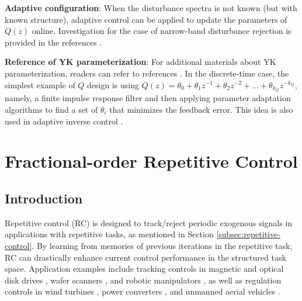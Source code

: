 \documentclass [11pt, proquest] {uwthesis}[2020/02/24]
\begin{document}
\textbf{Adaptive configuration}: When the disturbance spectra is not
known (but with known structure), adaptive control can be applied
to update the parameters of $Q(z)$ online. Investigation for the
case of narrow-band disturbance rejection is provided in the references
\cite{XuChen_TCST2012,chen2010unknown}.

\textbf{Reference of YK parameterization}: For additional materials
about YK parameterization, readers can refer to references \cite{landau2005adaptive,doyle2013feedback,ANDERSON19981485}.
In the discrete-time case, the simplest example of $Q$ design is
using $Q(z)=\theta_{0}+\theta_{1}z^{-1}+\theta_{2}z^{-2}+...+\theta_{k_{Q}}z^{-k_{Q}}$,
namely, a finite impulse response filter and then applying parameter
adaptation algorithms to find a set of $\theta_{i}$ that minimizes
the feedback error. This idea is also used in adaptive inverse control
\cite{Widrow2007}.


\chapter{Fractional-order Repetitive Control} \label{chap:Fractional-RC}

\section{Introduction} \label{sec:Fractional-RC-Introduction}

Repetitive control (RC) \cite{inoue1981highpower} is designed to
track/reject periodic exogenous signals in applications with repetitive
tasks, as mentioned in Section \ref{subsec:repetitive-control}. By learning from memories of previous iterations in the repetitive
task, RC can drastically enhance current control performance in the
structured task space. Application examples include tracking controls
in magnetic and optical disk drives \cite{chew1989digital,doh2006design},
wafer scanners \cite{XuChen_TCST_RC2013}, and robotic manipulators
\cite{cosner1990plug,meng2017robust}, as well as regulation controls
in wind turbines \cite{navalkar2014subspace,castro2017variable},
power converters \cite{nazir2015analysis}, and unmanned aerial vehicles
\cite{he2017repetitive}.
\end{document}
